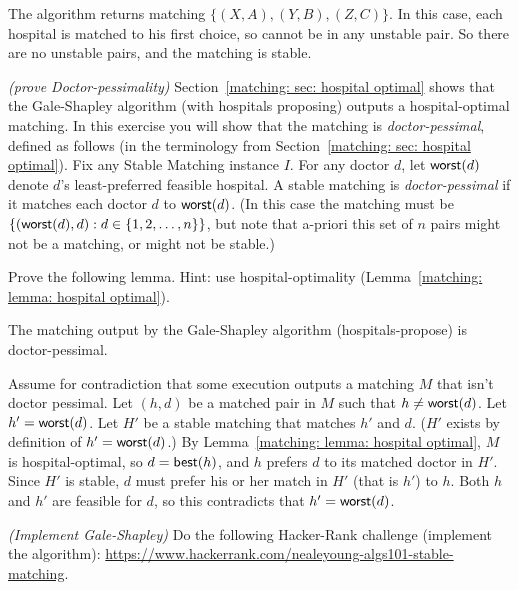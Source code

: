 \documentclass[11pt]{article}
\begin{document}
The algorithm returns matching $\{(X, A), (Y, B), (Z, C)\}$.
In this case, 
each hospital is matched to his first choice, so cannot be in any unstable pair.
So there are no unstable pairs, and the matching is stable.


\exercise\label{matching: exercise: girl pessimal}\emph{(prove Doctor-pessimality)}
Section~\ref{matching: sec: hospital optimal} shows that the Gale-Shapley algorithm (with hospitals proposing) outputs a hospital-optimal matching.
In this exercise you will show that the matching is \emph{doctor-pessimal},
defined as follows (in the terminology from Section~\ref{matching: sec: hospital optimal}).
Fix any Stable Matching instance $I$.
For any doctor $d$, let $\text{\sf worst}(d)$ denote $d$'s least-preferred feasible hospital.
A stable matching is \emph{doctor-pessimal} if it matches each doctor $d$ to $\text{\sf worst}(d)$.
(In this case the matching must be $\{(\text{\sf worst}(d), d) : d\in\{1,2,\ldots,n\}\}$,
but note that a-priori this set of $n$ pairs might not be a matching, or might not be stable.)

Prove the following lemma.  Hint: use hospital-optimality (Lemma~\ref{matching: lemma: hospital optimal}).

\begin{lemma}\label{matching: lemma: doctor pessimal}
  The matching output by the Gale-Shapley algorithm (hospitals-propose) is doctor-pessimal.
\end{lemma}

\solution
\begin{longFormProof}
  \step Assume for contradiction that some execution outputs a matching $M$ that isn't doctor pessimal.
  \step Let $(h, d)$ be a matched pair in $M$ such that $h\ne \text{\sf worst}(d)$.  Let $h' = \text{\sf worst}(d)$.
  \step Let $H'$ be a stable matching that matches $h'$ and $d$.
  ($H'$ exists by definition of $h'=\text{\sf worst}(d)$.)
  \step By Lemma~\ref{matching: lemma: hospital optimal}, $M$ is hospital-optimal, so $d=\text{\sf best}(h)$,
  and $h$ prefers $d$ to its matched doctor in $H'$.
  \step Since $H'$ is stable, $d$ must prefer his or her match in $H'$ (that is $h'$) to $h$.
  \step Both $h$ and $h'$ are feasible for $d$, so this contradicts that $h'=\text{\sf worst}(d)$.
\end{longFormProof}

\exercise \emph{(Implement Gale-Shapley)}
 Do the following Hacker-Rank challenge (implement the algorithm):
\url{https://www.hackerrank.com/nealeyoung-algs101-stable-matching}.

\solution 
{}
\end{document}
